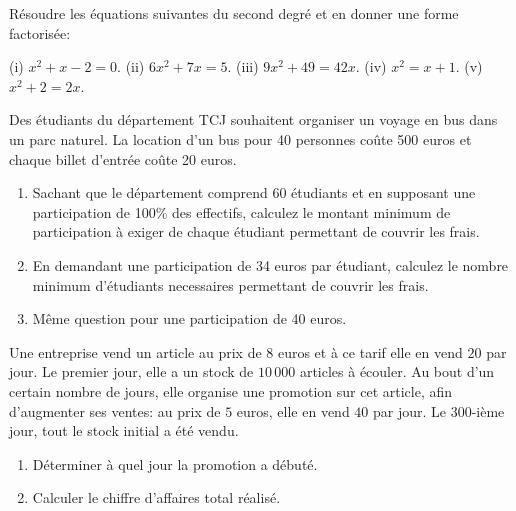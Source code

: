 \documentclass[a4paper, 11pt]{article}
\begin{document}
\exost R\'esoudre les \'equations suivantes du second degr\'e et en donner une forme factoris\'ee:
  \begin{center}
    (i) $x^2+ x- 2= 0$. \quad (ii) $6x^2+ 7x= 5$. \quad (iii) $9x^2+ 49= 42x$. \quad (iv) $x^2= x+ 1$. \quad (v) $x^2+ 2= 2x$.
  \end{center}


  \exost Des \'etudiants du d\'epartement TCJ souhaitent organiser un voyage en bus dans un parc naturel.
  La location d'un bus pour 40 personnes co\^ute 500 euros et chaque billet d'entr\'ee co\^ute 20 euros.
  \begin{enumerate}
   \item Sachant que le d\'epartement comprend 60 \'etudiants et en supposant une participation de 100\% des effectifs, calculez le montant minimum de participation \`a exiger de chaque \'etudiant
   permettant de couvrir les frais. %
   \item En demandant une participation de 34 euros par \'etudiant, calculez le nombre minimum d'\'etudiants necessaires permettant de couvrir les frais.
   \item M\^eme question pour une participation de 40 euros.
  \end{enumerate}

  \exost Une entreprise vend un article au prix de $8$ euros et \`a ce tarif elle en vend $20$ par jour. 
  Le premier jour, elle a un stock de $10\,000$ articles \`a \'ecouler. Au bout d'un certain nombre de jours, elle organise une promotion sur cet article, 
  afin d'augmenter ses ventes: au prix de $5$ euros, elle en vend $40$ par jour. Le $300$-i\`eme jour, tout le stock initial a \'et\'e vendu. \\
  \begin{enumerate}
   \item D\'eterminer \`a quel jour la promotion a d\'ebut\'e.
   \item Calculer le chiffre d'affaires total r\'ealis\'e.
  \end{enumerate}
 
\end{document}

